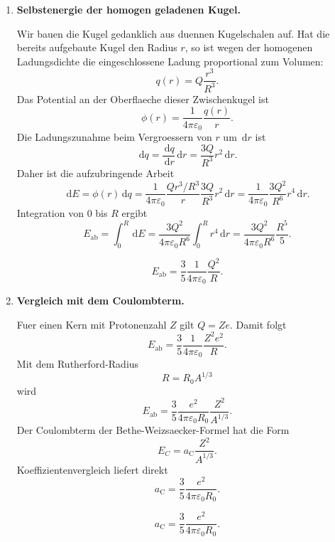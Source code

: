 \documentclass[11pt,a4paper]{scrartcl}
\newcommand{\dd}{\,\mathrm{d}}
\newcommand{\dv}[2]{\frac{\dd #1}{\dd #2}}
\theoremstyle{definition}
\theoremstyle{plain}
\theoremstyle{remark}
\newcommand{\Eab}{E_{\mathrm{ab}}}
\newcommand{\aC}{a_{\mathrm C}}
\begin{document}
\begin{enumerate}[label=(\alph*)]
    \item \textbf{Selbstenergie der homogen geladenen Kugel.}

    \begin{calculationbox}
    Wir bauen die Kugel gedanklich aus duennen Kugelschalen auf. Hat die bereits aufgebaute Kugel den Radius $r$, so ist wegen der homogenen Ladungsdichte die eingeschlossene Ladung proportional zum Volumen:
    \[
        q(r)=Q\frac{r^3}{R^3}.
    \]
    Das Potential an der Oberflaeche dieser Zwischenkugel ist
    \[
        \phi(r)=\frac{1}{4\pi\varepsilon_0}\frac{q(r)}{r}.
    \]
    Die Ladungszunahme beim Vergroessern von $r$ um $\dd r$ ist
    \[
        \dd q = \dv{q}{r}\dd r = \frac{3Q}{R^3}r^2\dd r.
    \]
    Daher ist die aufzubringende Arbeit
    \[
        \dd E = \phi(r)\dd q
        =\frac{1}{4\pi\varepsilon_0}\frac{Qr^3/R^3}{r}\frac{3Q}{R^3}r^2\dd r
        =\frac{1}{4\pi\varepsilon_0}\frac{3Q^2}{R^6}r^4\dd r.
    \]
    Integration von $0$ bis $R$ ergibt
    \[
        \Eab=\int_0^R \dd E
        =\frac{3Q^2}{4\pi\varepsilon_0R^6}\int_0^R r^4\dd r
        =\frac{3Q^2}{4\pi\varepsilon_0R^6}\frac{R^5}{5}.
    \]
    \end{calculationbox}

    \begin{answerbox}
    \[
        \boxed{\Eab=\frac{3}{5}\frac{1}{4\pi\varepsilon_0}\frac{Q^2}{R}}.
    \]
    \end{answerbox}

    \item \textbf{Vergleich mit dem Coulombterm.}

    \begin{calculationbox}
    Fuer einen Kern mit Protonenzahl $Z$ gilt $Q=Ze$. Damit folgt
    \[
        \Eab=\frac{3}{5}\frac{1}{4\pi\varepsilon_0}\frac{Z^2e^2}{R}.
    \]
    Mit dem Rutherford-Radius
    \[
        R=R_0A^{1/3}
    \]
    wird
    \[
        \Eab=\frac{3}{5}\frac{e^2}{4\pi\varepsilon_0R_0}\frac{Z^2}{A^{1/3}}.
    \]
    Der Coulombterm der Bethe-Weizsaecker-Formel hat die Form
    \[
        E_C=\aC\frac{Z^2}{A^{1/3}}.
    \]
    Koeffizientenvergleich liefert direkt
    \[
        \aC=\frac{3}{5}\frac{e^2}{4\pi\varepsilon_0R_0}.
    \]
    \end{calculationbox}

    \begin{answerbox}
    \[
        \boxed{\aC=\frac{3}{5}\frac{e^2}{4\pi\varepsilon_0R_0}}.
    \]
    \end{answerbox}


\end{enumerate}
\end{document}
